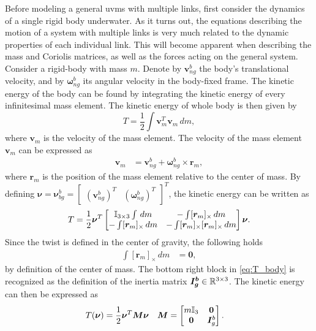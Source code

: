 Before modeling a general \gls{uvms} with multiple links,
first consider the dynamics of a single rigid body underwater.
As it turns out, the equations describing the motion
of a system with multiple links is very much related to the dynamic properties
of each individual link. This will become apparent when describing the mass
and Coriolis matrices, as well as the forces acting on the general system.
Consider a rigid-body with mass $m$. Denote by $\bm{v}_{ng}^b$ the body's translational
velocity, and by $\bm{\omega}_{ng}^b$ its angular velocity in the
body-fixed frame. The kinetic energy of the body can be found by integrating the
kinetic energy of every infinitesimal mass element. The kinetic energy
of whole body is then given by
\begin{equation}
    T = \frac{1}{2} \int \bm{v}_m^T \bm{v}_m\, dm,
\end{equation}
where $\bm{v}_m$ is the velocity of the mass element.
The velocity of the mass element $\bm{v}_m$ can be expressed as
\begin{align}
    \bm{v}_m &= \bm{v}_{ng}^b + \bm{\omega}_{ng}^b \times \bm{r}_m,
\end{align}
where $\bm{r}_m$ is the position of the mass element relative to the center of
mass. By defining $\bm{\nu} = \bm{\nu}_{bg}^b = \begin{bmatrix}(\bm{v}_{ng}^b)^T & (\bm{\omega}_{ng}^b)^T \end{bmatrix}^T$, the kinetic energy can be written as
\begin{align}
    T = \frac{1}{2} \bm{\nu}^T
    \begin{bmatrix}
        \mathbb{I}_{3\times 3} \int \,dm & - \int [\bm{r}_m]_\times \,dm \\
        - \int [\bm{r}_m]_\times \,dm & -\int [\bm{r}_m]_\times [\bm{r}_m]_\times \,dm
    \end{bmatrix}
    \bm{\nu}\label{eq:T_body}.
\end{align}
Since the twist is defined in the center of gravity, the following holds
\begin{align}
    \int [\bm{r}_m]_{\times} \,dm &= \bm{0},
\end{align}
by definition of the center of mass. The bottom right block in \autoref{eq:T_body} is recognized as the
definition of the inertia matrix $\bm{I_g^b} \in \mathbb{R}^{3\times 3}$. The kinetic energy can then be
expressed as
\begin{align}
    T(\bm{\nu}) &= \frac{1}{2} \bm{\nu}^T \bm{M} \bm{\nu} \label{eq:TM_body} &
    \bm{M} &= \begin{bmatrix} m\mathbb{I}_{3} & \bm{0} \\ \bm{0} & \bm{I}_g^b \end{bmatrix}.
\end{align}
